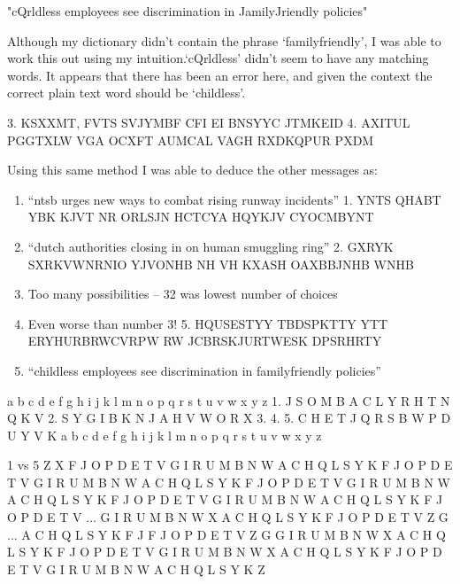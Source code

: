\documentclass[12pt,a4paper,twoside]{article}
\begin{document}
"cQrldless employees see discrimination in JamilyJriendly policies"

Although my dictionary didn't contain the phrase `familyfriendly', I was able
to work this out using my intuition.`cQrldless' didn't seem to have any
matching words. It appears that there has been an error here, and given the
context the correct plain text word should be `childless'. 

3. KSXXMT, FVTS SVJYMBF CFI EI BNSYYC JTMKEID 
4. AXITUL PGGTXLW VGA OCXFT AUMCAL VAGH RXDKQPUR PXDM 


Using this same method I was able to deduce the other messages as:
\begin{enumerate}
\item ``ntsb urges new ways to combat rising runway incidents''
     1. YNTS QHABT YBK KJVT NR ORLSJN HCTCYA HQYKJV CYOCMBYNT 
\item ``dutch authorities closing in on human smuggling ring''
     2. GXRYK SXRKVWNRNIO YJVONHB NH VH KXASH OAXBBJNHB WNHB 
\item Too many possibilities -- 32 was lowest number of choices
\item Even worse than number 3! 
     5. HQUSESTYY TBDSPKTTY YTT ERYHURBRWCVRPW RW JCBRSKJURTWESK DPSRHRTY 
\item ``childless employees see discrimination in familyfriendly policies''
\end{enumerate}

   a b c d e f g h i j k l m n o p q r s t u v w x y z
1. J S O M B   A   C       L Y R     H T N Q   K   V   
2. S   Y G I   B K N     J A H V     W O R X           
3.                                                     
4.                                                     
5. C   H E T J   Q R     S B W P D   U Y V         K   
   a b c d e f g h i j k l m n o p q r s t u v w x y z

                   
1 vs 5
                  Z
                  X
                  F J O P D E T V 
                  G I R U M B N W  
                  A C H Q L S Y K 
                F J O P D E T V 
                G I R U M B N W  
                A C H Q L S Y K 
              F J O P D E T V 
              G I R U M B N W
              A C H Q L S Y K
            F J O P D E T V 
            G I R U M B N W 
            A C H Q L S Y K 
          F J O P D E T V  
      ... G I R U M B N W X A C H Q L S Y K F J O P D E T V Z G ...
          A C H Q L S Y K F J
        F J O P D E T V Z G    
        G I R U M B N W X 
        A C H Q L S Y K
      F J O P D E T V 
      G I R U M B N W  
    X A C H Q L S Y K
    F J O P D E T V 
    G I R U M B N W  
    A C H Q L S Y K
                  Z
\end{document}
